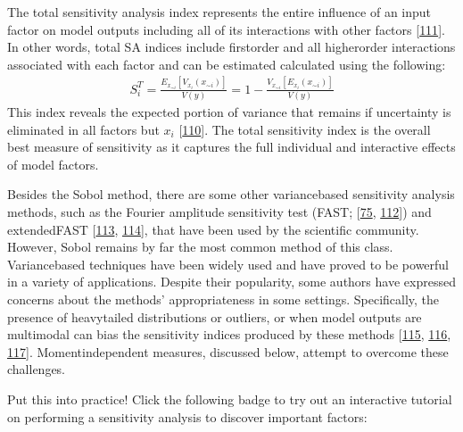 \documentclass[a4paper,10pt,english]{book}
\begin{document}
\sphinxAtStartPar
The total sensitivity analysis index represents the entire influence of an input factor on model outputs including all of its interactions with other factors {[}\hyperlink{cite.index:id150}{111}{]}. In other words, total SA indices include first\sphinxhyphen{}order and all higher\sphinxhyphen{}order interactions associated with each factor and can be estimated calculated using the following:
\begin{equation*}
\begin{split}S_i^T= \frac{E_{x_{\sim i}}[V_{x_i}(x_{\sim i})]}{V(y)} = 1 - \frac{V_{x_{\sim i}}[E_{x_{i}}(x_{\sim i})]}{V(y)}\end{split}
\end{equation*}
\sphinxAtStartPar
This index reveals the expected portion of variance that remains if uncertainty is eliminated in all factors but \(x_i\) {[}\hyperlink{cite.index:id149}{110}{]}. The total sensitivity index is the overall best measure of sensitivity as it captures the full individual and interactive effects of model factors.

\sphinxAtStartPar
Besides the Sobol method, there are some other variance\sphinxhyphen{}based sensitivity analysis methods, such as the Fourier amplitude sensitivity test (FAST; {[}\hyperlink{cite.index:id100}{75}, \hyperlink{cite.index:id151}{112}{]}) and extended\sphinxhyphen{}FAST {[}\hyperlink{cite.index:id152}{113}, \hyperlink{cite.index:id153}{114}{]}, that have been used by the scientific community. However, Sobol remains by far the most common method of this class. Variance\sphinxhyphen{}based techniques have been widely used and have proved to be powerful in a variety of applications. Despite their popularity, some authors have expressed concerns about the methods’ appropriateness in some settings. Specifically, the presence of heavy\sphinxhyphen{}tailed distributions or outliers, or when model outputs are multimodal can bias the sensitivity indices produced by these methods {[}\hyperlink{cite.index:id154}{115}, \hyperlink{cite.index:id155}{116}, \hyperlink{cite.index:id156}{117}{]}. Moment\sphinxhyphen{}independent measures, discussed below, attempt to overcome these challenges.


\nopagebreak


\sphinxAtStartPar
Put this into practice! Click the following badge to try out an interactive tutorial on performing a sensitivity analysis to discover important factors:

\sphinxAtStartPar
{}
\end{document}
